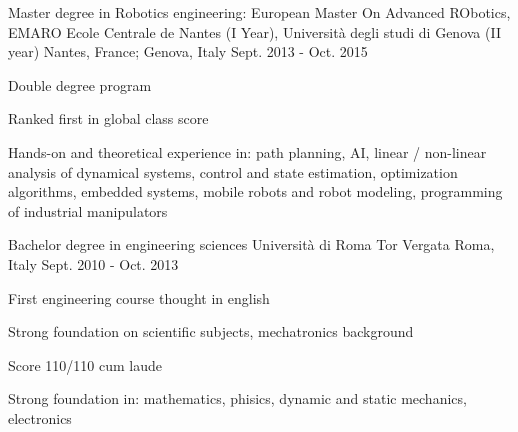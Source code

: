 





\begin{cventries}

  \cventry
    {Master degree in Robotics engineering: European Master On Advanced RObotics, EMARO} %
    {Ecole Centrale de Nantes (I Year), Università degli studi di Genova (II year)} %
    {Nantes, France; Genova, Italy} %
    {Sept. 2013 - Oct. 2015} %
    {
      \begin{cvitems} %
        \item{Double degree program}
        \item {Ranked first in global class score}
      \end{cvitems}
      \vspace{16pt}
      \begin{cvparagraph}
        Hands-on and theoretical experience in: path planning, AI, linear / non-linear analysis of dynamical systems, control and state estimation, optimization algorithms, embedded systems, mobile robots and robot modeling, programming of industrial manipulators
      \end{cvparagraph}
    }
    \vspace*{-15pt}
    \cventry
    {Bachelor degree in engineering sciences} %
    {Università di Roma Tor Vergata} %
    {Roma, Italy} %
    {Sept. 2010 - Oct. 2013} %
    {
      \begin{cvitems} %
        \item {First engineering course thought in english}
        \item {Strong foundation on scientific subjects, mechatronics background}
        \item {Score 110/110 cum laude}
      \end{cvitems}
      \vspace{16pt}
      \begin{cvparagraph}
        Strong foundation in: mathematics, phisics, dynamic and static mechanics, electronics
      \end{cvparagraph}
      \vspace{-16pt}
    }

\end{cventries}
\vspace*{8pt}

